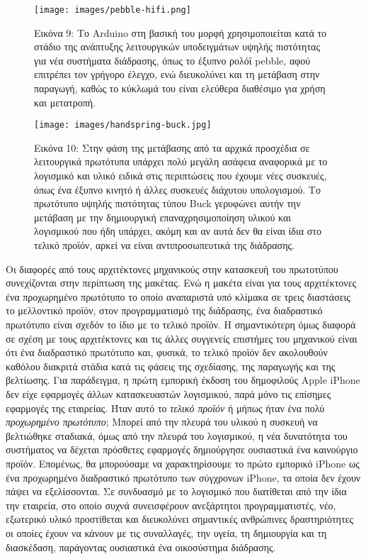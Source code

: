 \documentclass[
]{article}
\begin{document}
\leavevmode{}%
\begin{figure}
\hypertarget{fig:pebble-hifi}{%
\centering
\texttt{[image: images/pebble-hifi.png]}
\caption{Εικόνα 9: Το Arduino στη βασική του μορφή χρησιμοποιείται κατά
το στάδιο της ανάπτυξης λειτουργικών υποδειγμάτων υψηλής πιστότητας για
νέα συστήματα διάδρασης, όπως το έξυπνο ρολόϊ pebble, αφού επιτρέπει τον
γρήγορο έλεγχο, ενώ διευκολύνει και τη μετάβαση στην παραγωγή, καθώς το
κύκλωμά του είναι ελεύθερα διαθέσιμο για χρήση και
μετατροπή.}\label{fig:pebble-hifi}
}
\end{figure}

\leavevmode{}%
\begin{figure}
\hypertarget{fig:handspring-buck}{%
\centering
\texttt{[image: images/handspring-buck.jpg]}
\caption{Εικόνα 10: Στην φάση της μετάβασης από τα αρχικά προσχέδια σε
λειτουργικά πρωτότυπα υπάρχει πολύ μεγάλη ασάφεια αναφορικά με το
λογισμικό και υλικό ειδικά στις περιπτώσεις που έχουμε νέες συσκευές,
όπως ένα έξυπνο κινητό ή άλλες συσκευές διάχυτου υπολογισμού. Το
πρωτότυπο υψηλής πιστότητας τύπου Buck γερυφώνει αυτήν την μετάβαση με
την δημιουργική επαναχρησιμοποίηση υλικού και λογισμικού που ήδη
υπάρχει, ακόμη και αν αυτά δεν θα είναι ίδια στο τελικό προϊόν, αρκεί να
είναι αντιπροσωπευτικά της διάδρασης.}\label{fig:handspring-buck}
}
\end{figure}

Οι διαφορές από τους αρχιτέκτονες μηχανικούς στην κατασκευή του
πρωτοτύπου συνεχίζονται στην περίπτωση της μακέτας. Ενώ η μακέτα είναι
για τους αρχιτέκτονες ένα προχωρημένο πρωτότυπο το οποίο αναπαριστά υπό
κλίμακα σε τρεις διαστάσεις το μελλοντικό προϊόν, στον προγραμματισμό
της διάδρασης, ένα διαδραστικό πρωτότυπο είναι σχεδόν το ίδιο με το
τελικό προϊόν. Η σημαντικότερη όμως διαφορά σε σχέση με τους
αρχιτέκτονες και τις άλλες συγγενείς επιστήμες του μηχανικού είναι ότι
ένα διαδραστικό πρωτότυπο και, φυσικά, το τελικό προϊόν δεν ακολουθούν
καθόλου διακριτά στάδια κατά τις φάσεις της σχεδίασης, της παραγωγής και
της βελτίωσης. Για παράδειγμα, η πρώτη εμπορική έκδοση του δημοφιλούς
Apple iPhone δεν είχε εφαρμογές άλλων κατασκευαστών λογισμικού, παρά
μόνο τις επίσημες εφαρμογές της εταιρείας. Ήταν αυτό το \emph{τελικό
προϊόν} ή μήπως ήταν ένα πολύ \emph{προχωρημένο πρωτότυπο}; Μπορεί από
την πλευρά του υλικού η συσκευή να βελτιώθηκε σταδιακά, όμως από την
πλευρά του λογισμικού, η νέα δυνατότητα του συστήματος να δέχεται
πρόσθετες εφαρμογές δημιούργησε ουσιαστικά ένα καινούργιο προϊόν.
Επομένως, θα μπορούσαμε να χαρακτηρίσουμε το πρώτο εμπορικό iPhone ως
ένα προχωρημένο διαδραστικό πρωτότυπο των σύγχρονων iPhone, τα οποία δεν
έχουν πάψει να εξελίσσονται. Σε συνδυασμό με το λογισμικό που διατίθεται
από την ίδια την εταιρεία, στο οποίο συχνά συνεισφέρουν ανεξάρτητοι
προγραμματιστές, νέο, εξωτερικό υλικό προστίθεται και διευκολύνει
σημαντικές ανθρώπινες δραστηριότητες οι οποίες έχουν να κάνουν με τις
συναλλαγές, την υγεία, τη δημιουργία και τη διασκέδαση, παράγοντας
ουσιαστικά ένα οικοσύστημα διάδρασης.
\end{document}
